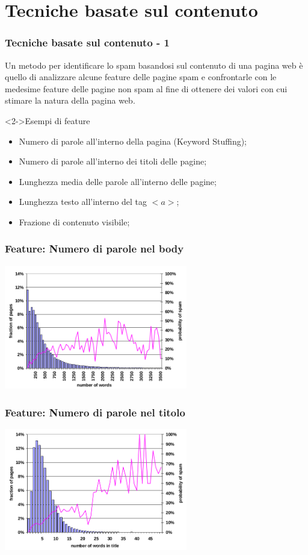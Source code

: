 \documentclass{beamer}
\begin{document}
\section{Tecniche basate sul contenuto}
\begin{frame}
    \frametitle{Tecniche basate sul contenuto - 1}
    Un metodo per identificare lo spam basandosi sul contenuto di una pagina web è  quello di analizzare alcune feature delle pagine spam e confrontarle con le medesime feature delle pagine non spam al fine di ottenere dei valori con cui stimare la natura della pagina web.
    \begin{block}<2->{Esempi di feature}
    \begin{itemize}
    \item Numero di parole all'interno della pagina (Keyword Stuffing);
    \item Numero di parole all'interno dei titoli delle pagine;
    \item Lunghezza media delle parole all'interno delle pagine;
    \item Lunghezza testo all'interno del tag \(<a>\);
    \item Frazione di contenuto visibile;
    \end{itemize}
    \end{block}
\end{frame}
\begin{frame}
    \frametitle{Feature: Numero di parole nel body}
  \begin{center}
  \includegraphics[width=8cm]{immagini/contenuto/fetterly3}
  \end{center}
\end{frame}
\begin{frame}
 \frametitle{Feature: Numero di parole nel titolo}
  \begin{center}
  \includegraphics[width=8cm]{immagini/contenuto/fetterly4}
  \end{center}
\end{frame}
\end{document}
